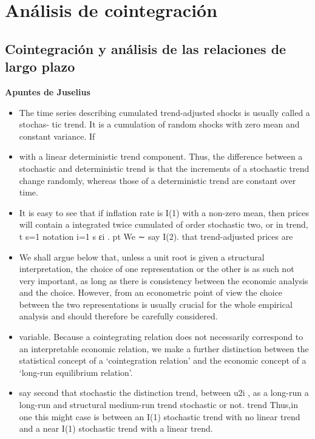 \documentclass[12pt, twoside]{book}\usepackage[]{graphicx}\usepackage[]{color}
\numberwithin{equation}{section}
\numberwithin{theorem}{section}
\numberwithin{teorema}{section}
\numberwithin{defi}{section}
\numberwithin{prop}{section}
\numberwithin{defi}{section}
\theoremstyle{plain}
\begin{document}
\chapter{Análisis de cointegración}
\section{Cointegración y análisis de las relaciones de largo plazo}

{\color{red} \textbf{Apuntes de Juselius}

\begin{itemize}
\item The time series describing cumulated trend-adjusted shocks is usually called a stochas-
tic trend. It is a cumulation of random shocks with zero mean and constant variance. If
\item with a linear deterministic trend component. Thus, the difference between a stochastic
and deterministic trend is that the increments of a stochastic trend change randomly,
whereas those of a deterministic trend are constant over time.
\item It is easy to see that if inflation rate is I(1) with a non-zero mean, then prices will contain
a integrated twice cumulated of order stochastic two, or in trend, 
t
 s=1 notation
i=1 s
 εi . pt We ∼ say I(2).
 that trend-adjusted prices are
\item We shall argue below that, unless a unit root is given a structural interpretation, the
choice of one representation or the other is as such not very important, as long as there is
consistency between the economic analysis and the choice. However, from an econometric
point of view the choice between the two representations is usually crucial for the whole
empirical analysis and should therefore be carefully considered.
\item variable.
Because a cointegrating relation does not necessarily correspond to an interpretable
economic relation, we make a further distinction between the statistical concept of a
‘cointegration relation’ and the economic concept of a ‘long-run equilibrium relation’.
\item say second that stochastic the distinction trend,
 between 
 u2i , as a long-run a long-run and structural medium-run trend stochastic or not. trend Thus,in one this might
 case
is between an I(1) stochastic trend with no linear trend and a near I(1) stochastic trend
with a linear trend.

\end{itemize}

}
\end{document}

